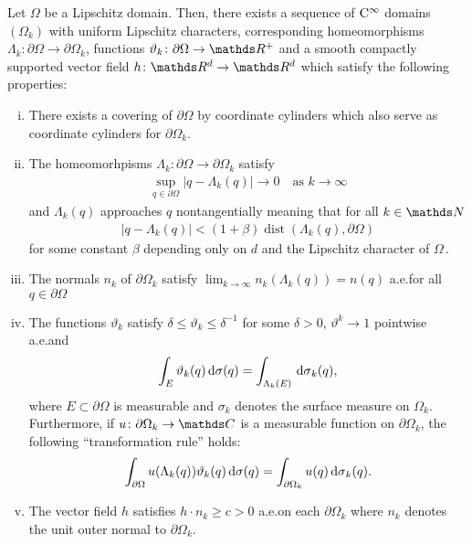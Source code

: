 \begin{thm}[Ne\v{c}as, Verchota]
  \label{thm:smoothApproximation}
  Let $\Omega$ be a Lipschitz domain.
  Then, there exists a sequence of $\mathrm{C}^\infty$ domains $(\Omega_k)$ with uniform Lipschitz characters, corresponding homeomorphisms $\Lambda_k \colon \partial\Omega \to \partial\Omega_k$, functions $\vartheta_k \colon \partial\Omega \to \R^+$ and a smooth compactly supported vector field $h \colon \R^d \to \R^d$ which satisfy the following properties:
  \begin{enumerate}[i)]
    \item There exists a covering of $\partial\Omega$ by coordinate cylinders which also serve as coordinate cylinders for $\partial\Omega_k$.
    \item The homeomorhpisms $\Lambda_k \colon \partial \Omega \to \partial\Omega_k$ satisfy
      \begin{align*}
        \sup_{q \in \partial\Omega} |q - \Lambda_k(q)| \to 0\quad\text{as } k \to \infty
      \end{align*}
      and $\Lambda_k(q)$ approaches $q$ nontangentially meaning that for all $k \in \N$
      \begin{align*}
        | q - \Lambda_k(q) | < (1 + \beta) \operatorname{dist}(\Lambda_k(q), \partial\Omega)
      \end{align*}
      for some constant $\beta$ depending only on $d$ and the Lipschitz character of $\Omega\,$.
    \item The normals $n_k$ of $\partial\Omega_k$ satisfy $\lim_{k \to \infty} n_k(\Lambda_k(q)) = n(q)$ a.e.\@ for all $q \in \partial\Omega$
    \item The functions $\vartheta_k$ satisfy $\delta \leq \vartheta_k \leq \delta^{-1}$ for some $\delta > 0$, $\vartheta^k \to 1$ pointwise a.e.\@ and
      \begin{align*}
        \int_E \vartheta_k(q) \, {\operatorname{d}\!{\sigma}}(q) = \int_{\Lambda_k(E)} \, {\operatorname{d}\!{\sigma}}_k(q),
      \end{align*}
      where $E \subset \partial \Omega$ is measurable and $\sigma_k$ denotes the surface measure on $\Omega_k$.
      Furthermore, if $u \colon \partial\Omega_k \to \C$ is a measurable function on $\partial\Omega_k$, the following ``transformation rule'' holds:
      \begin{align*}
         \int_{\partial\Omega} u(\Lambda_k(q)) \vartheta_k(q) \, {\operatorname{d}\!{\sigma}}(q) = \int_{\partial\Omega_k} u(q) \, {\operatorname{d}\!{\sigma}}_k(q) .
      \end{align*}
    \item The vector field $h$ satisfies $h \cdot  n_k \geq c > 0$ a.e.\@ on each $\partial\Omega_k$ where $n_k$ denotes the unit outer normal to $\partial\Omega_k$.
  \end{enumerate}
\end{thm}

